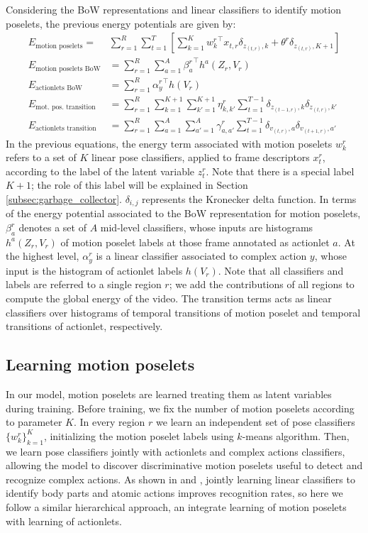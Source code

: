 Considering the BoW representations and linear classifiers to identify motion 
poselets, 
the previous energy potentials are given by:
{\small
\begin{align}
\label{eq:motionposelets}E_{\text{motion poselets}}  =  &\sum_{r=1}^R\sum_{t=1}^T  \left[ \sum_{k=1}^K {w^r_k}^\top 
x_{t,r}\delta_{z_{(t,r)},k} + \theta^r \delta_{z_{(t,r)},K+1}\right] \\
E_{\text{motion poselets BoW}} & = \sum_{r=1}^R \sum_{a=1}^A {\beta^r_{a}}^\top 
h^{a}(Z_r,V_r)\\
\label{eq:actionlets_BoW} E_{\text{actionlets BoW}} &=\sum_{r=1}^R {\alpha^r_{y}}^\top h(V_r)  \\
E_{\text{mot. pos. transition}} & = 
\sum_{r=1}^R\sum_{k=1}^{K+1}\sum_{k'=1}^{K+1} \eta^r_{k,k'} 
\sum_{t=1}^{T-1} \delta_{z_{(t-1,r)},k}\delta_{z_{(t,r)},k'}\\ 
\label{eq:actionletstransition}
E_{\text{actionlets transition}} & =\sum_{r=1}^R\sum_{a=1}^A\sum_{a'=1}^A \gamma^r_{a,a'} 
\sum_{t=1}^{T-1} 
\delta_{v_{(t,r)},a}\delta_{v_{(t+1,r)},a'} 
\end{align}
}
In the previous equations, the energy term associated with motion poselets 
$w^r_k$ refers to a set of $K$ linear pose classifiers, applied to frame 
descriptors $x_t^r$, according to the label of the latent variable $z_t^r$. 
Note that there is a special label $K+1$; the role of this label will be 
explained in Section \ref{subsec:garbage_collector}. $\delta_{i,j}$ represents 
the Kronecker delta function. In terms of the energy potential associated to 
the BoW representation for motion poselets, $\beta_a^r$ denotes a set of $A$ 
mid-level classifiers, whose inputs are histograms $h^a(Z_r,V_r)$ of motion 
poselet labels at those frame annotated as actionlet $a$. At the highest level, 
$\alpha^r_{y}$ is a linear classifier  associated to complex action $y$, whose 
input is the histogram of actionlet labels $h(V_r)$. Note that all classifiers 
and labels are referred to a single region $r$; we add the contributions of all 
regions to compute the global energy of the video. The transition terms acts as 
linear classifiers over histograms of temporal transitions of motion poselet 
and temporal transitions of actionlet, respectively.

\subsection{Learning motion poselets}
In our model, motion poselets are learned treating them as latent variables  
during training. Before training, we fix the number of motion poselets 
according to parameter $K$. In every region $r$ we learn an independent 
set of pose classifiers $\{w^r_k\}_{k=1}^K$, initializing the motion poselet 
labels using $k$-means algorithm. Then, we learn pose classifiers jointly with 
actionlets and complex actions classifiers, allowing the model to discover 
discriminative motion poselets useful to detect and recognize complex actions. 
As shown in \cite{Lillo2014} and \cite{Tao2015}, jointly learning linear 
classifiers to identify body parts and atomic actions improves recognition 
rates, so here we follow a similar hierarchical approach, an integrate learning 
of motion poselets with learning of actionlets.     

